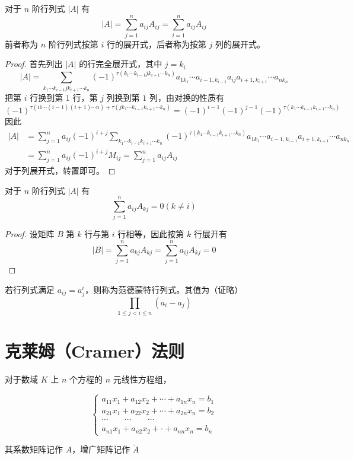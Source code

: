 \begin{theorem}
	对于 $n$ 阶行列式 $|A|$ 有
	$$|A| = \sum_{j=1}^na_{ij}A_{ij} = \sum_{i=1}^na_{ij}A_{ij}$$
	前者称为 $n$ 阶行列式按第 $i$ 行的展开式，后者称为按第 $j$ 列的展开式。
\end{theorem}

\begin{proof}
	首先列出 $|A|$ 的行完全展开式，其中 $j=k_i$
	$$|A|=\sum_{k_1\cdots k_{i-1}jk_{i+1}\cdots k_n}(-1)^{\tau(k_1\cdots k_{i-1}jk_{i+1}\cdots k_n)}a_{1k_1}\cdots a_{i-1,k_{i-1}}a_{ij}a_{i+1,k_{i+1}}\cdots a_{nk_n}$$
	把第 $i$ 行换到第 $1$ 行，第 $j$ 列换到第 $1$ 列，由对换的性质有
	$$(-1)^{\tau(i1\cdots (i-1)(i+1)\cdots n)+\tau(jk_1\cdots k_{i-1}k_{i+1}\cdots k_n)}=(-1)^{i-1}(-1)^{j-1}(-1)^{\tau(k_1\cdots k_{i-1}k_{i+1}\cdots k_n)}$$
	因此
	\begin{equation*}
		\begin{aligned}
			|A|&=\sum_{j=1}^na_{ij}(-1)^{i+j}\sum_{k_1\cdots k_{i-1}k_{i+1}\cdots k_n}(-1)^{\tau(k_1\cdots k_{i-1}k_{i+1}\cdots k_n)}a_{1k_1}\cdots a_{i-1,k_{i-1}}a_{i+1,k_{i+1}}\cdots a_{nk_n}\\
			&=\sum_{j=1}^na_{ij}(-1)^{i+j}M_{ij}=\sum_{j=1}^na_{ij}A_{ij}
		\end{aligned}
	\end{equation*}
	对于列展开式，转置即可。
\end{proof}

\begin{theorem}
	对于 $n$ 阶行列式 $|A|$ 有
	$$\sum_{j=1}^na_{ij}A_{kj} = 0(k\ne i)$$
\end{theorem}

\begin{proof}
	设矩阵 $B$ 第 $k$ 行与第 $i$ 行相等，因此按第 $k$ 行展开有
	$$|B|=\sum_{j=1}^na_{kj}A_{kj}=\sum_{j=1}^na_{ij}A_{kj}=0$$
\end{proof}

\begin{definition}
	 若行列式满足 $a_{ij} = a_j^i$，则称为范德蒙特行列式。其值为（证略）
	 $$\prod_{1 \leqslant j < i \leqslant n}(a_i-a_j)$$
\end{definition}

\section{克莱姆（Cramer）法则}

对于数域 $K$ 上 $n$ 个方程的 $n$ 元线性方程组，

\begin{equation*}
	\left\{
		\begin{matrix}
			a_{11}x_1+a_{12}x_2+\cdots+a_{1n}x_n=b_1\\
			a_{21}x_1+a_{22}x_2+\cdots+a_{2n}x_n=b_2\\
			\cdots\qquad\cdots\qquad\cdots\\
			a_{n1}x_1+a_{n2}x_2+\cdot +a_{nn}x_n=b_n
		\end{matrix}
	\right.
\end{equation*}

其系数矩阵记作 $A$，增广矩阵记作 $\widetilde{A}$ 
